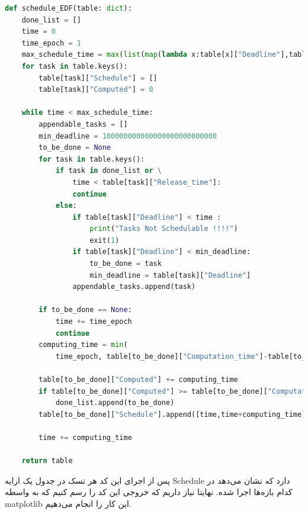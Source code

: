 \begin{latin}
    \begin{lstlisting}[language=python,style=mystyle]
def schedule_EDF(table: dict):
    done_list = []
    time = 0
    time_epoch = 1
    max_schedule_time = max(list(map(lambda x:table[x]["Deadline"],table)))
    for task in table.keys():
        table[task]["Schedule"] = []
        table[task]["Computed"] = 0

    while time < max_schedule_time:
        appendable_tasks = []
        min_deadline = 100000000000000000000000000
        to_be_done = None
        for task in table.keys():
            if task in done_list or \
                time < table[task]["Release_time"]:
                continue
            else:
                if table[task]["Deadline"] < time :
                    print("Tasks Not Schedulable !!!!")
                    exit(1)
                if table[task]["Deadline"] < min_deadline:
                    to_be_done = task
                    min_deadline = table[task]["Deadline"]
                appendable_tasks.append(task)

        if to_be_done == None:
            time += time_epoch
            continue
        computing_time = min(
            time_epoch, table[to_be_done]["Computation_time"]-table[to_be_done]["Computed"])

        table[to_be_done]["Computed"] += computing_time
        if table[to_be_done]["Computed"] >= table[to_be_done]["Computation_time"]:
            done_list.append(to_be_done)
        table[to_be_done]["Schedule"].append([time,time+computing_time])

        time += computing_time

    return table
    \end{lstlisting}
\end{latin}

پس از اجرای این کد هر تسک در جدول یک ارایه 
Schedule 
دارد که نشان می‌دهد در کدام بازه‌ها اجرا شده. 
نهایتا نیاز داریم که خروجی این کد را رسم کنیم که به واسطه 
matplotlib
این کار را انجام می‌دهیم.

